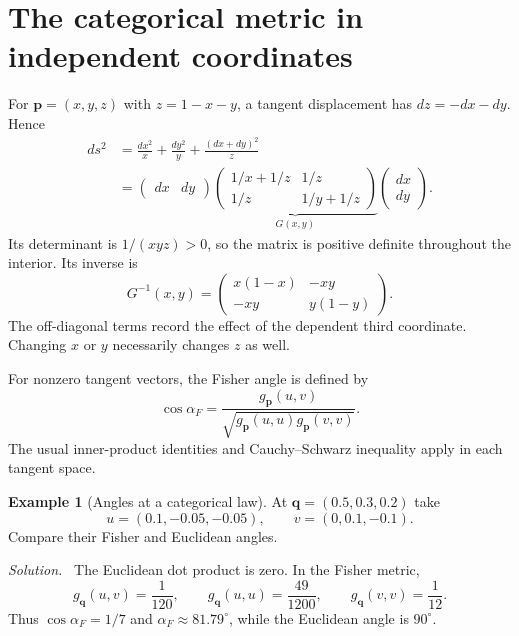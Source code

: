 \documentclass[11pt,oneside,openany]{book}
\theoremstyle{definition}
\newtheorem{example}{Example}[chapter]
\theoremstyle{remark}
\newenvironment{solution}{\par\smallskip\noindent\textit{Solution.}\ }{\par\smallskip}
\newcommand{\p}{\mathbf{p}}
\newcommand{\q}{\mathbf{q}}
\numberwithin{equation}{chapter}
\begin{document}
\section{The categorical metric in independent coordinates}
For $\p=(x,y,z)$ with $z=1-x-y$, a tangent displacement has $dz=-dx-dy$. Hence
\begin{align*}
ds^2&=\frac{dx^2}{x}+\frac{dy^2}{y}+\frac{(dx+dy)^2}{z}\\
&=\begin{pmatrix}dx&dy\end{pmatrix}
\underbrace{\begin{pmatrix}1/x+1/z&1/z\\1/z&1/y+1/z\end{pmatrix}}_{G(x,y)}
\begin{pmatrix}dx\\dy\end{pmatrix}.
\end{align*}
Its determinant is $1/(xyz)>0$, so the matrix is positive definite throughout the interior. Its inverse is
\begin{equation}\label{eq:inversefisher}
G^{-1}(x,y)=\begin{pmatrix}x(1-x)&-xy\\-xy&y(1-y)\end{pmatrix}.
\end{equation}
The off-diagonal terms record the effect of the dependent third coordinate. Changing $x$ or $y$ necessarily changes $z$ as well.

For nonzero tangent vectors, the Fisher angle is defined by
\[
\cos\alpha_F=\frac{g_\p(u,v)}{\sqrt{g_\p(u,u)g_\p(v,v)}}.
\]
The usual inner-product identities and Cauchy--Schwarz inequality apply in each tangent space.

\begin{example}[Angles at a categorical law]
At $\q=(0.5,0.3,0.2)$ take
\[
u=(0.1,-0.05,-0.05),\qquad v=(0,0.1,-0.1).
\]
Compare their Fisher and Euclidean angles.
\begin{solution}
The Euclidean dot product is zero. In the Fisher metric,
\[
g_\q(u,v)=\frac1{120},\qquad
g_\q(u,u)=\frac{49}{1200},\qquad
g_\q(v,v)=\frac1{12}.
\]
Thus $\cos\alpha_F=1/7$ and $\alpha_F\approx81.79^\circ$, while the Euclidean angle is $90^\circ$.
\end{solution}
\end{example}
\end{document}
